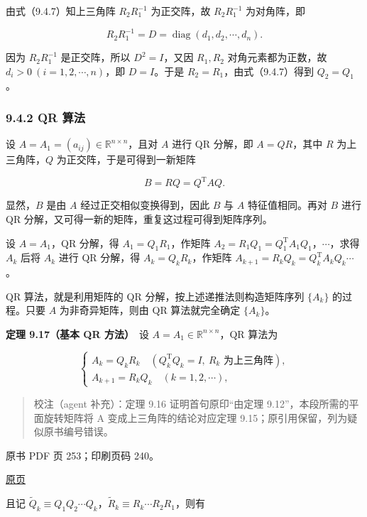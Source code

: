 由式（9.4.7）知上三角阵 \(R_2R_1^{-1}\) 为正交阵，故 \(R_2R_1^{-1}\) 为对角阵，即

\[
R_2R_1^{-1}=D=\operatorname{diag}(d_1,d_2,\cdots,d_n).
\]

因为 \(R_2R_1^{-1}\) 是正交阵，所以 \(D^2=I\)，又因 \(R_1,R_2\) 对角元素都为正数，故 \(d_i>0\ (i=1,2,\cdots,n)\)，即 \(D=I\)。于是 \(R_2=R_1\)，由式（9.4.7）得到 \(Q_2=Q_1\)。

\subsubsection{9.4.2 QR 算法}\label{ch09b-qr-ux7b97ux6cd5-1}

设 \(A=A_1=(a_{ij})\in\mathbb R^{n\times n}\)，且对 \(A\) 进行 QR 分解，即 \(A=QR\)，其中 \(R\) 为上三角阵，\(Q\) 为正交阵，于是可得到一新矩阵

\[
B=RQ=Q^{\mathrm T}AQ.
\]

显然，\(B\) 是由 \(A\) 经过正交相似变换得到，因此 \(B\) 与 \(A\) 特征值相同。再对 \(B\) 进行 QR 分解，又可得一新的矩阵，重复这过程可得到矩阵序列。

设 \(A=A_1\)，QR 分解，得 \(A_1=Q_1R_1\)，作矩阵 \(A_2=R_1Q_1=Q_1^{\mathrm T}A_1Q_1\)，\(\cdots\)，求得 \(A_k\) 后将 \(A_k\) 进行 QR 分解，得 \(A_k=Q_kR_k\)，作矩阵 \(A_{k+1}=R_kQ_k=Q_k^{\mathrm T}A_kQ_k\cdots\)。

QR 算法，就是利用矩阵的 QR 分解，按上述递推法则构造矩阵序列 \(\{A_k\}\) 的过程。只要 \(A\) 为非奇异矩阵，则由 QR 算法就完全确定 \(\{A_k\}\)。

\textbf{定理 9.17（基本 QR 方法）}　设 \(A=A_1\in\mathbb R^{n\times n}\)，QR 算法为

\[
\begin{cases}
A_k=Q_kR_k\quad(Q_k^{\mathrm T}Q_k=I,\ R_k\text{ 为上三角阵}),\\
A_{k+1}=R_kQ_k\quad(k=1,2,\cdots),
\end{cases}
\tag{9.4.8}
\]

\begin{quote}
校注（agent 补充）：定理 9.16 证明首句原印``由定理 9.12''，本段所需的平面旋转矩阵将 A 变成上三角阵的结论对应定理 9.15；原引用保留，列为疑似原书编号错误。
\end{quote}

\clearpage

原书 PDF 页 253；印刷页码 240。

\href{source-images/pdf-253.jpeg}{原页}

且记 \(\widetilde Q_k\equiv Q_1Q_2\cdots Q_k\)，\(\widetilde R_k\equiv R_k\cdots R_2R_1\)，则有

